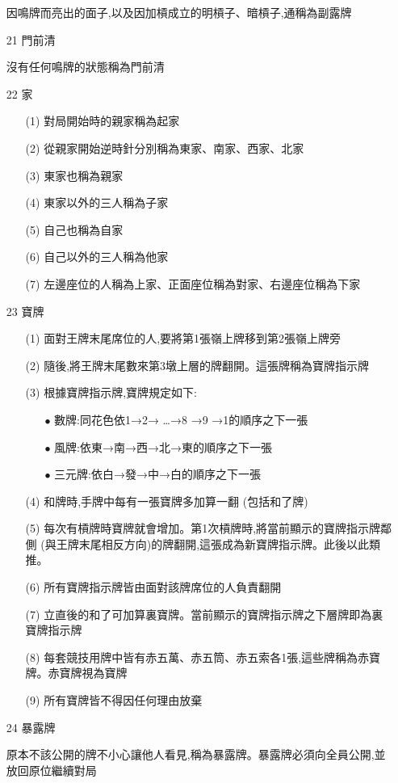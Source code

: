 \documentclass[a4paper,12pt]{article}
\begin{document}
\begin{itemize}
    \item[] 因鳴牌而亮出的面子,以及因加槓成立的明槓子、暗槓子,通稱為副露牌
    \item[21] 門前清
    \item[] 沒有任何鳴牌的狀態稱為門前清
    \item[22] 家
        \begin{itemize}
            \item[(1)] 對局開始時的親家稱為起家
            \item[(2)] 從親家開始逆時針分別稱為東家、南家、西家、北家
            \item[(3)] 東家也稱為親家
            \item[(4)] 東家以外的三人稱為子家
            \item[(5)] 自己也稱為自家
            \item[(6)] 自己以外的三人稱為他家
            \item[(7)] 左邊座位的人稱為上家、正面座位稱為對家、右邊座位稱為下家
        \end{itemize}
    \item[23] 寶牌
        \begin{itemize}
            \item[(1)] 面對王牌末尾席位的人,要將第1張嶺上牌移到第2張嶺上牌旁
            \item[(2)] 隨後,將王牌末尾數來第3墩上層的牌翻開。這張牌稱為寶牌指示牌
            \item[(3)] 根據寶牌指示牌,寶牌規定如下:
            \begin{itemize}
                \item[$\bullet$] 數牌:同花色依1→2→ \dots →8 →9 →1的順序之下一張
                \item[$\bullet$] 風牌:依東→南→西→北→東的順序之下一張
                \item[$\bullet$] 三元牌:依白→發→中→白的順序之下一張
            \end{itemize}
            \item[(4)] 和牌時,手牌中每有一張寶牌多加算一翻 (包括和了牌)
            \item[(5)] 每次有槓牌時寶牌就會增加。第1次槓牌時,將當前顯示的寶牌指示牌鄰側 (與王牌末尾相反方向)的牌翻開,這張成為新寶牌指示牌。此後以此類推。
            \item[(6)] 所有寶牌指示牌皆由面對該牌席位的人負責翻開
            \item[(7)] 立直後的和了可加算裏寶牌。當前顯示的寶牌指示牌之下層牌即為裏寶牌指示牌
            \item[(8)] 每套競技用牌中皆有赤五萬、赤五筒、赤五索各1張,這些牌稱為赤寶牌。赤寶牌視為寶牌
            \item[(9)] 所有寶牌皆不得因任何理由放棄
        \end{itemize}
    \item[24] 暴露牌
    \item[] 原本不該公開的牌不小心讓他人看見,稱為暴露牌。暴露牌必須向全員公開,並放回原位繼續對局
\end{itemize}
\end{document}
